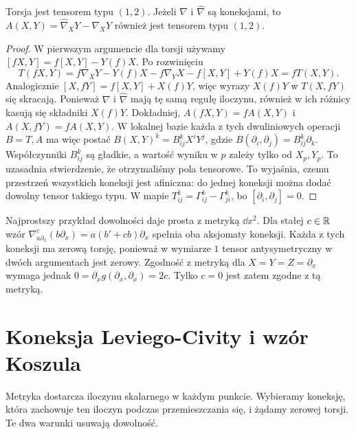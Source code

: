 \begin{stwierdzenie}
\label{prop:torsja-tensor-roznica}
Torsja jest tensorem typu $(1,2)$. Jeżeli
$\nabla$ i $\widehat\nabla$ są koneksjami,
to $A(X,Y)=\widehat\nabla_XY-\nabla_XY$
również jest tensorem typu $(1,2)$.
\end{stwierdzenie}
\begin{proof}
W pierwszym argumencie dla torsji używamy
$[fX,Y]=f[X,Y]-Y(f)X$. Po rozwinięciu
\[
 T(fX,Y)=f\nabla_XY-Y(f)X-f\nabla_YX
          -f[X,Y]+Y(f)X=fT(X,Y).
\]
Analogicznie $[X,fY]=f[X,Y]+X(f)Y$,
więc wyrazy $X(f)Y$ w $T(X,fY)$ się skracają.
Ponieważ $\nabla$ i $\widehat\nabla$ mają tę
samą regułę iloczynu, również w ich różnicy
kasują się składniki $X(f)Y$.
Dokładniej,
$A(fX,Y)=fA(X,Y)$ i $A(X,fY)=fA(X,Y)$.
W lokalnej bazie każda z tych dwuliniowych operacji
$B=T,A$ ma więc postać
$B(X,Y)^k=B^k_{ij}X^iY^j$, gdzie
$B(\partial_i,\partial_j)=B^k_{ij}\partial_k$.
Współczynniki $B^k_{ij}$ są gładkie, a wartość wyniku
w $p$ zależy tylko od $X_p,Y_p$. To uzasadnia
stwierdzenie, że otrzymaliśmy pola tensorowe.
To wyjaśnia, czemu przestrzeń wszystkich koneksji
jest afiniczna: do jednej koneksji można dodać
dowolny tensor takiego typu. W mapie
$T^k_{ij}=\Gamma^k_{ij}-\Gamma^k_{ji}$,
bo $[\partial_i,\partial_j]=0$.
\end{proof}

Najprostszy przykład dowolności daje prosta z metryką $\dd x^2$.
Dla stałej $c\in\mathbb{R}$ wzór
$\nabla^c_{a\partial_x}(b\partial_x)=a(b'+cb)\partial_x$
spełnia oba aksjomaty koneksji.
Każda z tych koneksji ma zerową torsję, ponieważ w wymiarze
$1$ tensor antysymetryczny w dwóch argumentach jest zerowy.
Zgodność z metryką dla $X=Y=Z=\partial_x$ wymaga jednak
$0=\partial_x g(\partial_x,\partial_x)=2c$.
Tylko $c=0$ jest zatem zgodne z tą metryką.

\section{Koneksja Leviego-Civity i wzór Koszula}
\label{sec:levi-civita-koszul}

Metryka dostarcza iloczynu skalarnego w każdym
punkcie. Wybieramy koneksję, która zachowuje ten
iloczyn podczas przemieszczania się, i żądamy
zerowej torsji. Te dwa warunki usuwają dowolność.

